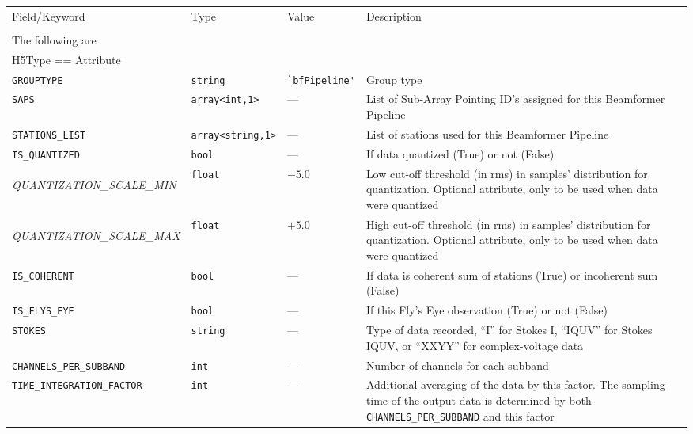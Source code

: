 \documentclass[a4paper,10pt,bibtotoc]{scrartcl}
\begin{document}
  \begin{supertabular}{|lllp{5.5cm}|}
    \hline
    \sc Field/Keyword  & \sc Type & \sc Value & Description \\
    \sc   & \sc & \sc & \\
    \hline \hline
    \sc The following are & \sc & \sc & \\
    \sc H5Type == Attribute & \sc & \sc & \\
    \hline
    \verb|GROUPTYPE|     & \verb|string| & \verb|`bfPipeline'| & Group type  \\
    \verb|SAPS|          & \verb|array<int,1>| & --- & List of Sub-Array Pointing ID's assigned for this Beamformer Pipeline \\
    \verb|STATIONS_LIST| & \verb|array<string,1>| & --- & List of stations used for this Beamformer Pipeline \\
    \verb|IS_QUANTIZED|  & \verb|bool| & --- & If data quantized (True) or not (False) \\
    \begin{scriptsize}\textit{QUANTIZATION\_SCALE\_MIN}\end{scriptsize} & \verb|float| & $-5.0$ & Low cut-off threshold (in rms) in samples' distribution for quantization. Optional attribute, only to be used when data were quantized \\
    \begin{scriptsize}\textit{QUANTIZATION\_SCALE\_MAX}\end{scriptsize} & \verb|float| & $+5.0$ & High cut-off threshold (in rms) in samples' distribution for quantization. Optional attribute, only to be used when data were quantized \\
    \verb|IS_COHERENT|   & \verb|bool| & --- & If data is coherent sum of stations (True) or incoherent sum (False) \\
    \verb|IS_FLYS_EYE|   & \verb|bool| & --- & If this Fly's Eye observation (True) or not (False) \\
    \verb|STOKES|        & \verb|string| & --- & Type of data recorded, ``I'' for Stokes I, ``IQUV'' for Stokes IQUV, or ``XXYY'' for complex-voltage data \\
    \verb|CHANNELS_PER_SUBBAND| & \verb|int| & --- & Number of channels for each subband \\
    \verb|TIME_INTEGRATION_FACTOR| & \verb|int| & --- & Additional averaging of the data by this factor. The sampling time of the output data is determined by both \verb|CHANNELS_PER_SUBBAND| and this factor \\

\end{supertabular}
\end{document}
